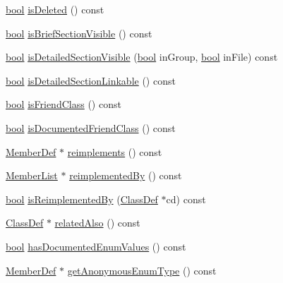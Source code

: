 \begin{DoxyCompactItemize}
\item 
\hyperlink{qglobal_8h_a1062901a7428fdd9c7f180f5e01ea056}{bool} \hyperlink{class_member_def_a478f10c10279701fbd591e92b29e0bab}{is\+Deleted} () const 
\item 
\hyperlink{qglobal_8h_a1062901a7428fdd9c7f180f5e01ea056}{bool} \hyperlink{class_member_def_acb939719f6b36bd3559d2881959e2907}{is\+Brief\+Section\+Visible} () const 
\item 
\hyperlink{qglobal_8h_a1062901a7428fdd9c7f180f5e01ea056}{bool} \hyperlink{class_member_def_a82c5fe7d85861883d4bbe1b3227c127f}{is\+Detailed\+Section\+Visible} (\hyperlink{qglobal_8h_a1062901a7428fdd9c7f180f5e01ea056}{bool} in\+Group, \hyperlink{qglobal_8h_a1062901a7428fdd9c7f180f5e01ea056}{bool} in\+File) const 
\item 
\hyperlink{qglobal_8h_a1062901a7428fdd9c7f180f5e01ea056}{bool} \hyperlink{class_member_def_ae9aef9ee496fb54a27cc01aedc030fed}{is\+Detailed\+Section\+Linkable} () const 
\item 
\hyperlink{qglobal_8h_a1062901a7428fdd9c7f180f5e01ea056}{bool} \hyperlink{class_member_def_a6030a88e9abc48d52c58fa2728b9778b}{is\+Friend\+Class} () const 
\item 
\hyperlink{qglobal_8h_a1062901a7428fdd9c7f180f5e01ea056}{bool} \hyperlink{class_member_def_a98ad30c44f0be225028621e281cf6c21}{is\+Documented\+Friend\+Class} () const 
\item 
\hyperlink{class_member_def}{Member\+Def} $\ast$ \hyperlink{class_member_def_a11725dbf0f76b2565621e84ced774ee6}{reimplements} () const 
\item 
\hyperlink{class_member_list}{Member\+List} $\ast$ \hyperlink{class_member_def_a798e9c02d20df06ad480d90745ceafbd}{reimplemented\+By} () const 
\item 
\hyperlink{qglobal_8h_a1062901a7428fdd9c7f180f5e01ea056}{bool} \hyperlink{class_member_def_a3684eb372cc5a2c7624a3489d3b1ffea}{is\+Reimplemented\+By} (\hyperlink{class_class_def}{Class\+Def} $\ast$cd) const 
\item 
\hyperlink{class_class_def}{Class\+Def} $\ast$ \hyperlink{class_member_def_a9870bb1aa67b87b52265ee0fe8347012}{related\+Also} () const 
\item 
\hyperlink{qglobal_8h_a1062901a7428fdd9c7f180f5e01ea056}{bool} \hyperlink{class_member_def_a85f8cd3b69a0787cf07e47750d575958}{has\+Documented\+Enum\+Values} () const 
\item 
\hyperlink{class_member_def}{Member\+Def} $\ast$ \hyperlink{class_member_def_a94758e6927a0c73d498477e9ac34676d}{get\+Anonymous\+Enum\+Type} () const 

\end{DoxyCompactItemize}

